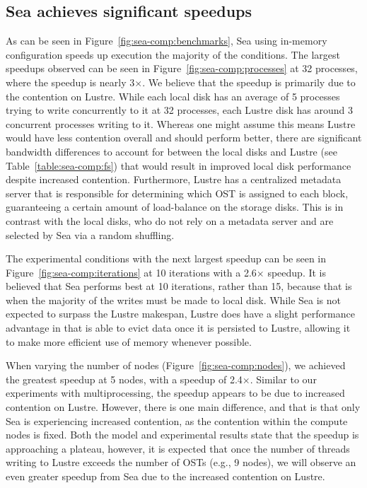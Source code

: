 \documentclass[10pt,journal,compsoc]{IEEEtran}
\begin{document}
      \subsection{Sea achieves significant speedups}

      As can be seen in Figure~\ref{fig:sea-comp:benchmarks}, Sea using
      in-memory configuration speeds up execution the majority of the
      conditions. The largest speedups observed can be seen in
      Figure~\ref{fig:sea-comp:processes} at 32 processes, where the speedup is
      nearly 3$\times$. We believe that the speedup is primarily due to the
      contention on Lustre. While each local disk has an average of 5 processes
      trying to write concurrently to it at 32 processes, each Lustre disk has around
      3 concurrent processes writing to it. Whereas one might assume this means
      Lustre would have less contention overall and should perform better, there
      are significant bandwidth differences to account for between the local
      disks and Lustre (see Table~\ref{table:sea-comp:fs}) that would result in
      improved local disk performance despite increased contention. Furthermore,
      Lustre has a centralized metadata server that is responsible for
      determining which OST is assigned to each block, guaranteeing a certain
      amount of load-balance on the storage disks. This is in contrast with the
      local disks, who do not rely on a metadata server and are selected by Sea
      via a random shuffling.

      The experimental conditions with the next largest speedup can be seen in
      Figure~\ref{fig:sea-comp:iterations} at 10 iterations with a 2.6$\times$
      speedup. It is believed that Sea performs best at 10 iterations, rather
      than 15, because that is when the majority of the writes must be made to
      local disk. While Sea is not expected to surpass the Lustre makespan,
      Lustre does have a slight performance advantage in that is able to evict
      data once it is persisted to Lustre, allowing it to make more efficient
      use of memory whenever possible. 

      When varying the number of nodes (Figure~\ref{fig:sea-comp:nodes}), we
      achieved the greatest speedup at 5 nodes, with a speedup of 2.4$\times$.
      Similar to our experiments with multiprocessing, the speedup appears
      to be due to increased contention on Lustre. However, there is one main
      difference, and that is that only Sea is experiencing increased
      contention, as the contention within the compute nodes is fixed. Both the
      model and experimental results state that the speedup is approaching a
      plateau, however, it is expected that once the number of threads writing
      to Lustre exceeds the number of OSTs (e.g., 9 nodes), we will observe an
      even greater speedup from Sea due to the increased contention on Lustre.
\end{document}

